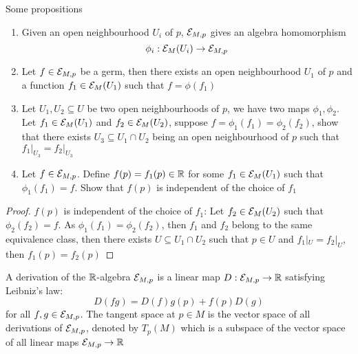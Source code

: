 \begin{proposition}
	Some propositions
	\begin{enumerate}
		\item Given an open neighbourhood $U_i$ of $p$, $\mathcal{E}_{M, p}$ gives an algebra homomorphism
		$$
		\phi_i: \mathcal{E}_M(U_i) \to \mathcal{E}_{M, p}
		$$
		
		\item Let $f \in \mathcal{E}_{M, p}$ be a germ, then there exists an open neighbourhood $U_1$ of $p$ and a function $f_1 \in \mathcal{E}_M(U_1)$ such that $f = \phi(f_1)$
		
		\item Let $U_1, U_2 \subseteq U$ be two open neighbourhoods of $p$, we have two maps $\phi_1, \phi_2$. Let $f_1 \in \mathcal{E}_M(U_1)$ and $f_2 \in \mathcal{E}_M(U_2)$, suppose $f = \phi_1(f_1) = \phi_2(f_2)$, show that there exists $U_3 \subseteq U_1 \cap U_2$ being an open neighbourhood of $p$ such that $f_1 \vert_{U_3} = f_2 \vert_{U_3}$
		
		\item Let $f \in \mathcal{E}_{M, p}$. Define $f(p) = f_1(p) \in \mathbb{R}$ for some $f_1 \in \mathcal{E}_M(U_1)$ such that $\phi_1(f_1) = f$. Show that $f(p)$ is independent of the choice of $f_1$      
	\end{enumerate}
	\begin{proof}
		$f(p)$ is independent of the choice of $f_1$: Let $f_2 \in \mathcal{E}_M(U_2)$ such that $\phi_2(f_2) = f$. As $\phi_1(f_1) = \phi_2(f_2)$, then $f_1$ and $f_2$ belong to the same equivalence class, then there exists $U \subseteq U_1 \cap U_2$ such that $p \in U$ and $f_1|_U = f_2|_U$, then $f_1(p) = f_2(p)$
	\end{proof}
\end{proposition}

\begin{definition}
	A derivation of the $\mathbb{R}$-algebra $\mathcal{E}_{M, p}$ is a linear map $D: \mathcal{E}_{M, p} \to \mathbb{R}$ satisfying Leibniz's law:
	$$
	D(fg) = D(f) g(p) + f(p) D(g)
	$$
	for all $f, g \in \mathcal{E}_{M, p}$. The tangent space at $p \in M$ is the vector space of all derivations of $\mathcal{E}_{M, p}$, denoted by $T_p(M)$ which is a subspace of the vector space of all linear maps $\mathcal{E}_{M, p} \to \mathbb{R}$
\end{definition}

